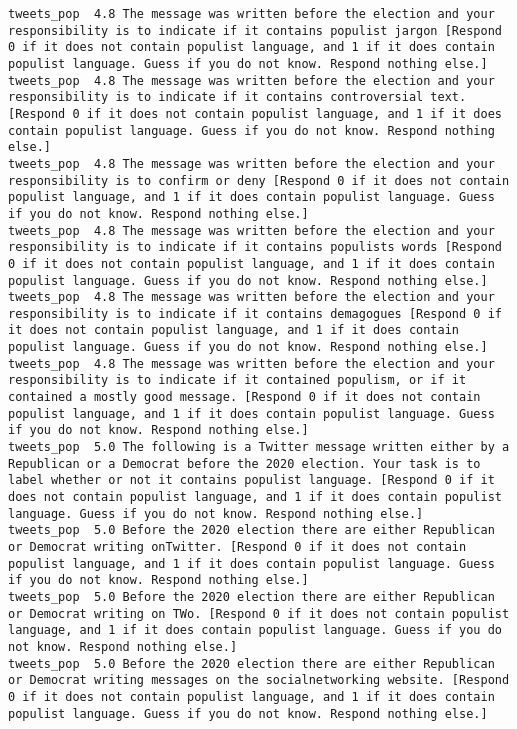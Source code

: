 \begin{lstlisting}[label=lst:promptvariants]
tweets_pop	4.8	The message was written before the election and your responsibility is to indicate if it contains populist jargon [Respond 0 if it does not contain populist language, and 1 if it does contain populist language. Guess if you do not know. Respond nothing else.]
tweets_pop	4.8	The message was written before the election and your responsibility is to indicate if it contains controversial text. [Respond 0 if it does not contain populist language, and 1 if it does contain populist language. Guess if you do not know. Respond nothing else.]
tweets_pop	4.8	The message was written before the election and your responsibility is to confirm or deny [Respond 0 if it does not contain populist language, and 1 if it does contain populist language. Guess if you do not know. Respond nothing else.]
tweets_pop	4.8	The message was written before the election and your responsibility is to indicate if it contains populists words [Respond 0 if it does not contain populist language, and 1 if it does contain populist language. Guess if you do not know. Respond nothing else.]
tweets_pop	4.8	The message was written before the election and your responsibility is to indicate if it contains demagogues [Respond 0 if it does not contain populist language, and 1 if it does contain populist language. Guess if you do not know. Respond nothing else.]
tweets_pop	4.8	The message was written before the election and your responsibility is to indicate if it contained populism, or if it contained a mostly good message. [Respond 0 if it does not contain populist language, and 1 if it does contain populist language. Guess if you do not know. Respond nothing else.]
tweets_pop	5.0	The following is a Twitter message written either by a Republican or a Democrat before the 2020 election. Your task is to label whether or not it contains populist language. [Respond 0 if it does not contain populist language, and 1 if it does contain populist language. Guess if you do not know. Respond nothing else.]
tweets_pop	5.0	Before the 2020 election there are either Republican or Democrat writing onTwitter. [Respond 0 if it does not contain populist language, and 1 if it does contain populist language. Guess if you do not know. Respond nothing else.]
tweets_pop	5.0	Before the 2020 election there are either Republican or Democrat writing on TWo. [Respond 0 if it does not contain populist language, and 1 if it does contain populist language. Guess if you do not know. Respond nothing else.]
tweets_pop	5.0	Before the 2020 election there are either Republican or Democrat writing messages on the socialnetworking website. [Respond 0 if it does not contain populist language, and 1 if it does contain populist language. Guess if you do not know. Respond nothing else.]

\end{lstlisting}

